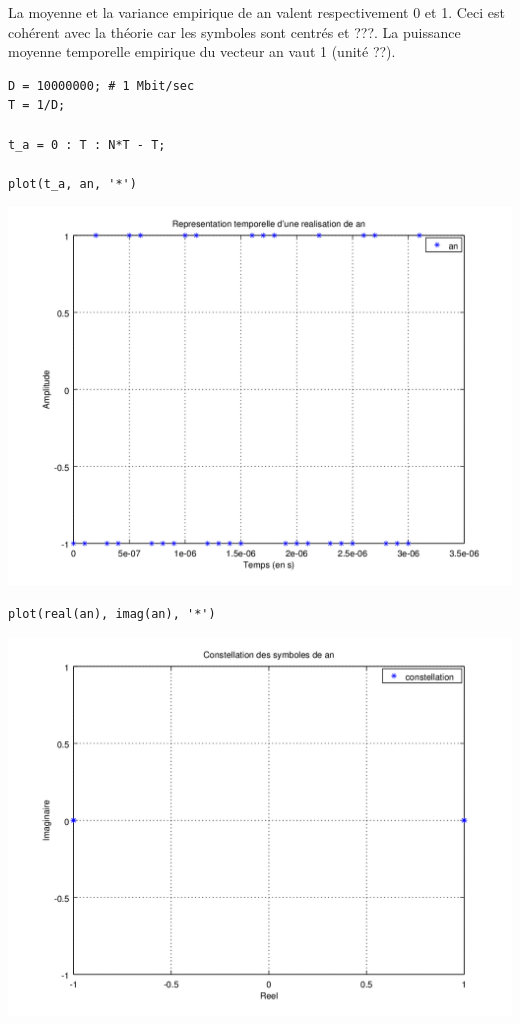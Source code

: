 \documentclass{acm_proc_article-sp}
\begin{document}
La moyenne et la variance empirique de an valent respectivement 0 et 1. Ceci est cohérent avec la théorie car les symboles sont centrés et ???.
La puissance moyenne temporelle empirique du vecteur an vaut 1 (unité ??).

\begin{lstlisting}
D = 10000000; # 1 Mbit/sec
T = 1/D;

t_a = 0 : T : N*T - T;

plot(t_a, an, '*')
\end{lstlisting}

\begin{center}
\includegraphics[scale=0.45]{ak_2.png}
\end{center}

\begin{lstlisting}
plot(real(an), imag(an), '*')
\end{lstlisting}

\begin{center}
\includegraphics[scale=0.45]{constell_2.png}
\end{center}
\end{document}

